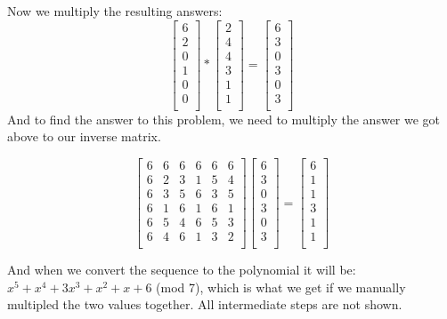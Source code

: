 \documentclass[11pt]{article}
\newenvironment{qparts}{\begin{enumerate}[{(}a{)}]}{\end{enumerate}}
\begin{document}
\begin{qparts}
Now we multiply the resulting answers:
\[
\begin{bmatrix}
6 \\
2 \\
0 \\
1 \\
0 \\
0 \\
\end{bmatrix} *
\begin{bmatrix}
2 \\
4 \\
4 \\
3 \\
1 \\
1 \\
\end{bmatrix} = 
\begin{bmatrix}
6 \\
3 \\
0 \\
3 \\
0 \\
3 \\
\end{bmatrix}
\]
And to find the answer to this problem, we need to multiply the answer we got above to our inverse matrix.

\[
\begin{bmatrix}
    6       & 6 & 6 & 6 & 6 & 6 \\
    6       & 2 & 3 & 1 & 5 & 4 \\
    6       & 3 & 5 & 6 & 3 & 5 \\
    6       & 1 & 6 & 1 & 6 & 1 \\
    6       & 5 & 4 & 6 & 5 & 3 \\
    6       & 4 & 6 & 1 & 3 & 2 \\
\end{bmatrix}
\begin{bmatrix}
6 \\
3 \\
0 \\
3 \\
0 \\
3 \\
\end{bmatrix} =
\begin{bmatrix}
6 \\
1 \\
1 \\
3 \\
1 \\
1 \\
\end{bmatrix}
\]  

And when we convert the sequence to the polynomial it will be: $x^5 + x^4 + 3x^3 + x^2 + x + 6$ (mod 7), which is what we get if we manually multipled the two values together. All intermediate steps are not shown.
\end{qparts}
\end{document}
